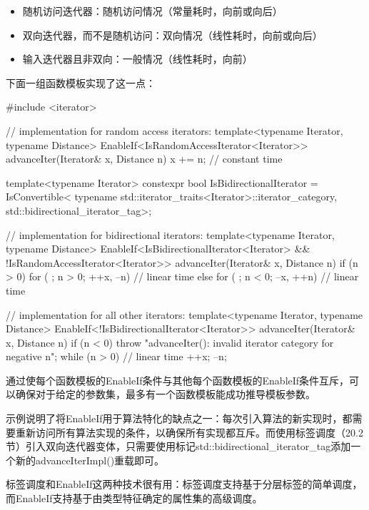 \begin{itemize}
\item 
随机访问迭代器：随机访问情况（常量耗时，向前或向后）

\item
双向迭代器，而不是随机访问：双向情况（线性耗时，向前或向后）

\item
输入迭代器且非双向：一般情况（线性耗时，向前）
\end{itemize}

下面一组函数模板实现了这一点：

\begin{cpp}
#include <iterator>

// implementation for random access iterators:
template<typename Iterator, typename Distance>
EnableIf<IsRandomAccessIterator<Iterator>>
advanceIter(Iterator& x, Distance n) {
	x += n; // constant time
}

template<typename Iterator>
constexpr bool IsBidirectionalIterator =
	IsConvertible<
		typename std::iterator_traits<Iterator>::iterator_category,
		std::bidirectional_iterator_tag>;

// implementation for bidirectional iterators:
template<typename Iterator, typename Distance>
EnableIf<IsBidirectionalIterator<Iterator> &&
		!IsRandomAccessIterator<Iterator>>
advanceIter(Iterator& x, Distance n) {
	if (n > 0) {
		for ( ; n > 0; ++x, --n) { // linear time
		}
	} else {
		for ( ; n < 0; --x, ++n) { // linear time
		}
	}
}

// implementation for all other iterators:
template<typename Iterator, typename Distance>
EnableIf<!IsBidirectionalIterator<Iterator>>
advanceIter(Iterator& x, Distance n) {
	if (n < 0) {
		throw "advanceIter(): invalid iterator category for negative n";
	}
	while (n > 0) { // linear time
		++x;
		--n;
	}
}
\end{cpp}

通过使每个函数模板的EnableIf条件与其他每个函数模板的EnableIf条件互斥，可以确保对于给定的参数集，最多有一个函数模板能成功推导模板参数。

示例说明了将EnableIf用于算法特化的缺点之一：每次引入算法的新实现时，都需要重新访问所有算法实现的条件，以确保所有实现都互斥。而使用标签调度（20.2节）引入双向迭代器变体，只需要使用标记std::bidirectional\_iterator\_tag添加一个新的advanceIterImpl()重载即可。

标签调度和EnableIf这两种技术很有用：标签调度支持基于分层标签的简单调度，而EnableIf支持基于由类型特征确定的属性集的高级调度。

